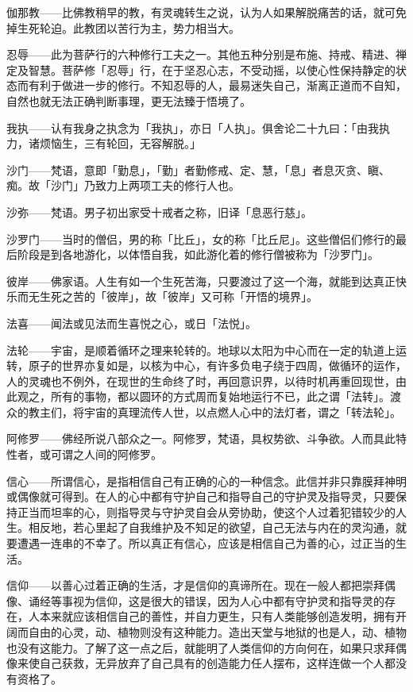 \documentclass[twoside,openany]{book}
\begin{document}
\textbullet 伽那教——比佛教稍早的教，有灵魂转生之说，认为人如果解脱痛苦的话，就可免掉生死轮迫。此教团以苦行为主，势力相当大。

\textbullet 忍辱——此为菩萨行的六种修行工夫之一。其他五种分别是布施、持戒、精进、禅定及智慧。菩萨修「忍辱」行，在于坚忍心志，不受动摇，以使心性保持静定的状态而有利于做进一步的修行。不知忍辱的人，最易迷失自己，渐离正道而不自知，自然也就无法正确判断事理，更无法臻于悟境了。

\textbullet 我执——认有我身之执念为「我执」，亦日「人执」。俱舍论二十九曰：「由我执力，诸烦恼生，三有轮回，无容解脱。」

\textbullet 沙门——梵语，意即「勤息」，「勤」者勤修戒、定、慧，「息」者息灭贪、瞋、痴。故「沙门」乃致力上两项工夫的修行人也。

\textbullet 沙弥——梵语。男子初出家受十戒者之称，旧译「息恶行慈」。

\textbullet 沙罗门——当时的僧侣，男的称「比丘」，女的称「比丘尼」。这些僧侣们修行的最后阶段是到各地游化，以体悟自我，如此游化着的修行僧被称为「沙罗门」。

\textbullet 彼岸——佛家语。人生有如一个生死苦海，只要渡过了这一个海，就能到达真正快乐而无生死之苦的「彼岸」，故「彼岸」又可称「开悟的境界」。


\textbullet 法喜——闻法或见法而生喜悦之心，或日「法悦」。

\textbullet 法轮——宇宙，是顺着循环之理来轮转的。地球以太阳为中心而在一定的轨道上运转，原子的世界亦复如是，以核为中心，有许多负电子绕于四周，做循环的运作，人的灵魂也不例外，在现世的生命终了时，再回意识界，以待时机再重回现世，由此观之，所有的事物，都以圆环的方式周而复始地运行不已，此之谓「法转」。渡众的教主们，将宇宙的真理流传人世，以点燃人心中的法灯者，谓之「转法轮」。

\textbullet 阿修罗——佛经所说八部众之一。阿修罗，梵语，具权势欲、斗争欲。人而具此特性者，或可谓之人间的阿修罗。

\textbullet 信心——所谓信心，是指相信自己有正确的心的一种信念。此信并非只靠膜拜神明或偶像就可得到。在人的心中都有守护自己和指导自己的守护灵及指导灵，只要保持正当而坦率的心，则指导灵与守护灵自会从旁协助，使这个人过着犯错较少的人生。相反地，若心里起了自我维护及不知足的欲望，自己无法与内在的灵沟通，就要遭遇一连串的不幸了。所以真正有信心，应该是相信自己为善的心，过正当的生活。

\textbullet 信仰——以善心过着正确的生活，才是信仰的真谛所在。现在一般人都把崇拜偶像、诵经等事视为信仰，这是很大的错误，因为人心中都有守护灵和指导灵的存在，人本来就应该相信自己的善性，并自力更生，只有人类能够创造发明，拥有开阔而自由的心灵，动、植物则没有这种能力。造出天堂与地狱的也是人，动、植物也没有这能力。了解了这一点之后，就能明了人类信仰的方向何在，如果只求拜偶像来使自己获救，无异放弃了自己具有的创造能力任人摆布，这样连做一个人都没有资格了。
\end{document}
